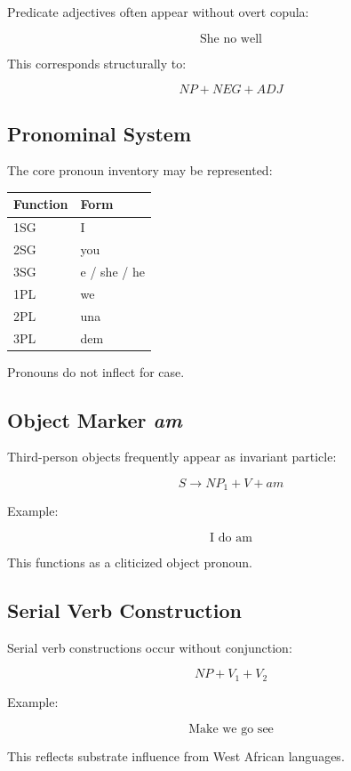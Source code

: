 \documentclass[12pt]{article}
\begin{document}
Predicate adjectives often appear without overt copula:

\[
\text{She no well}
\]

This corresponds structurally to:

\[
NP + NEG + ADJ
\]

\subsection{Pronominal System}

The core pronoun inventory may be represented:

\begin{center}
\begin{tabular}{ll}
\textbf{Function} & \textbf{Form} \\ \hline
1SG & I \\
2SG & you \\
3SG & e / she / he \\
1PL & we \\
2PL & una \\
3PL & dem \\
\end{tabular}
\end{center}

Pronouns do not inflect for case.

\subsection{Object Marker \textit{am}}

Third-person objects frequently appear as invariant particle:

\[
S \rightarrow NP_1 + V + am
\]

Example:

\[
\text{I do am}
\]

This functions as a cliticized object pronoun.

\subsection{Serial Verb Construction}

Serial verb constructions occur without conjunction:

\[
NP + V_1 + V_2
\]

Example:

\[
\text{Make we go see}
\]

This reflects substrate influence from West African languages.
\end{document}
